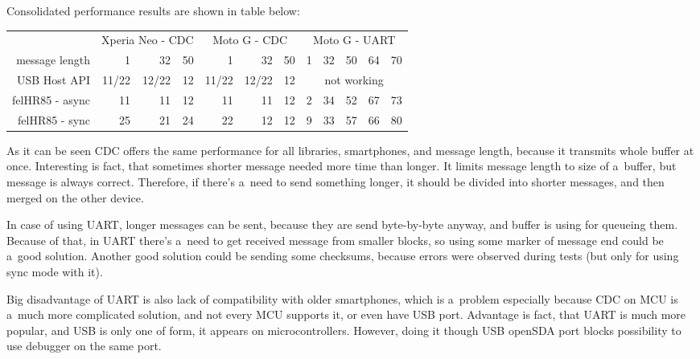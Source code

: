 Consolidated performance results are shown in table below:
\begin{center}
\begin{tabular}{r|r|r|r|r|r|r|r|r|r|r|r}
& \multicolumn{3}{c|}{Xperia Neo - CDC} & \multicolumn{3}{c|}{Moto G - CDC} &
\multicolumn{5}{c}{Moto G - UART} \\
message length & 1 & 32 & \hspace{3ex}50 & 
1 & 32 & \hspace{3ex}50 & \hspace{1ex}1 & 
32 & 50 & 64 & 70
\\
\hline
USB Host API & 
11/22 & 12/22 & 12 & 11/22 & 12/22 & 12 &
\multicolumn{5}{c}{\cellcolor{red!50}not working}
\\
felHR85 - async & 
11 & 11 & 12 & 11 & 11 & 12 & 2 & 34 & 52 & 67 & 73 \\
felHR85 - sync & 
25 & 21 & 24 & 22 & 12 & 12 &
9 & 33 & \cellcolor{yellow!50}57 & 66 & \cellcolor{yellow!50}80
\end{tabular}
\end{center}

As it can be seen CDC offers the same performance for all libraries,
smartphones, and message length, because it transmits whole buffer at once.
Interesting is fact, that sometimes shorter message needed more time than
longer.
It limits message length to size of a~buffer, but message is always correct.
Therefore, if there's a~need to send something longer, it should be divided into
shorter messages, and then merged on the other device.

In case of using UART, longer messages can be sent, because they are send
byte-by-byte anyway, and buffer is using for queueing them.
Because of that, in UART there's a~need to get received message from smaller
blocks, so using some marker of message end could be a~good solution.
Another good solution could be sending some checksums, because errors were
observed during tests (but only for using sync mode with it).

Big disadvantage of UART is also lack of compatibility with older smartphones,
which is a~problem especially because CDC on MCU is a~much more complicated
solution, and not every MCU supports it, or even have USB port.
Advantage is fact, that UART is much more popular, and USB is only one of form,
it appears on microcontrollers.
However, doing it though USB openSDA port blocks possibility to use debugger on
the same port.

